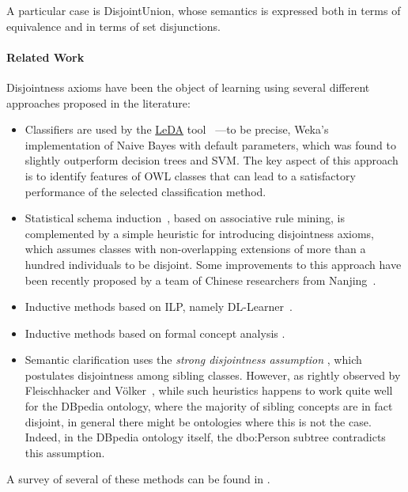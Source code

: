 \documentclass[a4paper]{article}
\newcounter{ex}
\begin{document}
A particular case is  \textsf{DisjointUnion}, whose semantics is expressed
both in terms of equivalence and in terms of set disjunctions.

\paragraph{Related Work}

Disjointness axioms have been the object of learning using several different
approaches proposed in the literature:
\begin{itemize}
  \item Classifiers are used by the \href{http://ontoware/projects/leda}{LeDA}
    tool~\cite{VoelkerVrandecicSureHotho2007,MeilickeVoelkerStuckenschmidt2008}%
    ---to be precise, Weka's implementation of Naive Bayes with default parameters,
    which was found to slightly outperform decision trees and SVM.
    The key aspect of this approach is to identify features of OWL classes that can
    lead to a satisfactory performance of the selected classification method.
  \item Statistical schema induction~\cite{VoelkerNiepert2011}, based on
    associative rule mining, is complemented by a simple heuristic
    for introducing disjointness axioms, which assumes classes with non-overlapping
    extensions of more than a hundred individuals to be disjoint.
    Some improvements to this approach have been recently proposed by a team
    of Chinese researchers from Nanjing~\cite{MaGaoWuQi2014}.
  \item Inductive methods based on ILP, namely DL-Learner~\cite{Lehmann2009}.
  \item Inductive methods based on formal concept analysis
    \cite{BaaderGanterSertkayaSattler2007}.
  \item Semantic clarification \cite{Schlobach2005}
    uses the \emph{strong disjointness assumption} \cite{CornetAbuHanna2002},
    which postulates disjointness among sibling classes. However, as rightly
    observed by Fleischhacker and V\"olker~\cite{FleischhackerVoelker2011},
    while such heuristics happens to work quite well for the DBpedia ontology,
    where the majority of sibling concepts are in fact disjoint, in general
    there might be ontologies  where this is not the case. Indeed, in the DBpedia
    ontology itself, the \textsf{dbo:Person} subtree contradicts this assumption.
\end{itemize}
A survey of several of these methods can be found in \cite{FleischhackerVoelker2011}.
\end{document}

